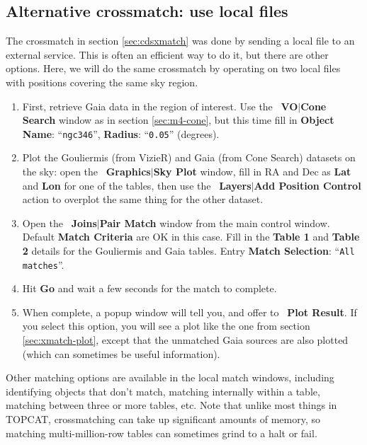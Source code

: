 \documentclass{article}
\newcommand{\buttimg}[1]
           {\mbox{\vtop{\vskip-2ex\hbox{\texttt{[image: \#1]}}}}}
\newcommand{\lab}[1]{{\bf #1}}
\newcommand{\ma}[2]{\buttimg{#1}~\lab{#2}}
\newcommand{\mb}[3]{\buttimg{#1}~\lab{#2}$\mid$\lab{#3}}
\newcommand{\entry}[2]{\lab{#1}: ``{\tt #2}''}
\begin{document}
\begin{minipage}[t]{11cm}

  \subsection{Alternative crossmatch: use local files}
  \raggedright
  The crossmatch in section \ref{sec:cdsxmatch} was done by sending
  a local file to an external service.
  This is often an efficient way to do it, but there are other options.
  Here, we will do the same crossmatch by operating on two local files
  with positions covering the same sky region.
  \begin{enumerate}
  \item First, retrieve Gaia data in the region of interest.
        Use the \mb{CONE_DIALOG.png}{VO}{Cone Search} window as in
        section \ref{sec:m4-cone}, but this time fill in
        \entry{Object Name}{ngc346}, \entry{Radius}{0.05} (degrees).
  \item Plot the Gouliermis (from VizieR) and Gaia (from Cone Search)
        datasets on the sky:
        open the \mb{skyplot_button.png}{Graphics}{Sky Plot} window,
        fill in RA and Dec as \lab{Lat} and \lab{Lon} for one of the tables,
        then use the \mb{poscontrol_button.png}{Layers}{Add Position Control}
        action to overplot the same thing for the other dataset.
  \item Open the \mb{pairmatch_button.png}{Joins}{Pair Match} window
        from the main control window.
        Default \lab{Match Criteria} are OK in this case.
        Fill in the \lab{Table 1} and \lab{Table 2} details for the
        Gouliermis and Gaia tables.
        Entry \entry{Match Selection}{All matches}.
  \item Hit \lab{Go} and wait a few seconds for the match to complete.
  \item When complete, a popup window will tell you, and offer to
        \ma{matchplot2.png}{Plot Result}.
        If you select this option, you will see a plot like the one from
        section \ref{sec:xmatch-plot}, except that the unmatched Gaia
        sources are also plotted (which can sometimes be useful information).
  \end{enumerate}
  Other matching options are available in the local match windows,
  including identifying objects that don't match, matching internally
  within a table, matching between three or more tables, etc.
  Note that unlike most things in TOPCAT, crossmatching can take up
  significant amounts of memory, so matching multi-million-row tables
  can sometimes grind to a halt or fail.


\end{minipage}
\end{document}
